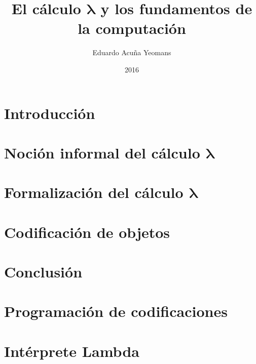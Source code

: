 \documentclass[letterpaper,twoside,openright,11pt]{book}
\newcommand{\bs}{\boldsymbol}
\theoremstyle{plain}%
\theoremstyle{definition}
\theoremstyle{remark}
\begin{document}
\title{El cálculo \( \bs{λ} \) y los fundamentos de la computación}
\author{Eduardo Acuña Yeomans}
\date{2016}

\maketitle

\frontmatter
\tableofcontents

\mainmatter

\chapter*{Introducción}
\label{ch:introduccion}


\chapter{\texorpdfstring{Noción informal del cálculo \( \bs{λ} \)}{Noción informal del cálculo lambda}}
\label{ch:nocion-informal}


\chapter{\texorpdfstring{Formalización del cálculo \( \bs{λ} \)}{Formalización del cálculo lambda}}
\label{ch:formalizacion}


\chapter{Codificación de objetos}
\label{ch:codificacion}


\chapter*{Conclusión}
\label{ch:conclusion}


\appendix

\chapter{Programación de codificaciones}
\label{ap:lambda-scheme}


% 

% 

\chapter{Intérprete Lambda}
\label{ap:lambda}



\nocite{*}


\end{document}

